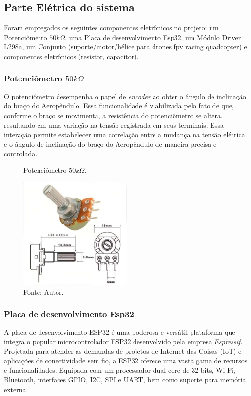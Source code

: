 \subsection{Parte Elétrica do sistema}

Foram empregados os seguintes componentes eletrônicos no projeto: um Potenciômetro $50k\Omega$, uma Placa de desenvolvimento Esp32, um Módulo Driver L298n, um Conjunto (suporte/motor/hélice para drones fpv racing quadcopter) e componentes eletrônicos (resistor, capacitor).

\subsubsection{Potenciômetro $50k\Omega$}

O potenciômetro desempenha o papel de \textit{encoder} ao obter o ângulo de inclinação do braço do Aeropêndulo. Essa funcionalidade é viabilizada pelo fato de que, conforme o braço se movimenta, a resistência do potenciômetro se altera, resultando em uma variação na tensão registrada em seus terminais. Essa interação permite estabelecer uma correlação entre a mudança na tensão elétrica e o ângulo de inclinação do braço do Aeropêndulo de maneira precisa e controlada.

\begin{figure}[!h]
	\centering
	\caption{Potenciômetro $50k\Omega$.}
	\includegraphics[width=0.5\textwidth]{Capitulos/3_simulacao_e_prototipo/3_figuras/pote.pdf}
	\caption*{Fonte: Autor.}
	\label{fig3:image_04}
\end{figure}




\subsubsection{Placa de desenvolvimento Esp32}

A placa de desenvolvimento ESP32 é uma poderosa e versátil plataforma que integra o popular microcontrolador ESP32 desenvolvido pela empresa  \textit{Espressif}. Projetada para atender às demandas de projetos de Internet das Coisas (IoT) e aplicações de conectividade sem fio, a ESP32 oferece uma vasta gama de recursos e funcionalidades. Equipada com um processador dual-core de 32 bits, Wi-Fi, Bluetooth, interfaces GPIO, I2C, SPI e UART, bem como suporte para memória externa.

